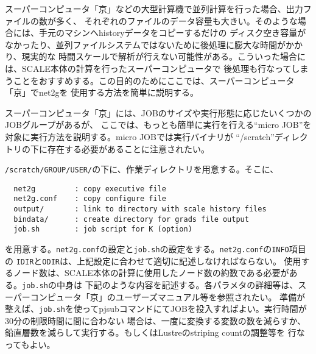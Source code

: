 スーパーコンピュータ「京」などの大型計算機で並列計算を行った場合、出力ファイルの数が多く、
それぞれのファイルのデータ容量も大きい。そのような場合には、手元のマシンへhistoryデータをコピーするだけの
ディスク空き容量がなかったり、並列ファイルシステムではないために後処理に膨大な時間がかかり、現実的な
時間スケールで解析が行えない可能性がある。こういった場合には、SCALE本体の計算を行ったスーパーコンピュータで
後処理も行なってしまうことをおすすめする。この目的のためにここでは、スーパーコンピュータ「京」でnet2gを
使用する方法を簡単に説明する。

スーパーコンピュータ「京」には、JOBのサイズや実行形態に応じたいくつかのJOBグループがあるが、
ここでは、もっとも簡単に実行を行える``micro JOB''を対象に実行方法を説明する。micro JOBでは実行バイナリが
``/scratch''ディレクトリの下に存在する必要があることに注意されたい。

\verb|/scratch/GROUP/USER/|の下に、作業ディレクトリを用意する。そこに、
\begin{verbatim}
  net2g         : copy executive file
  net2g.conf    : copy configure file
  output/       : link to directory with scale history files
  bindata/      : create directory for grads file output
  job.sh        : job script for K (option)
\end{verbatim}
を用意する。\verb|net2g.conf|の設定と\verb|job.sh|の設定をする。\verb|net2g.conf|の\verb|INFO|項目の
\verb|IDIR|と\verb|ODIR|は、上記設定に合わせて適切に記述しなければならない。
使用するノード数は、SCALE本体の計算に使用したノード数の約数である必要がある。\verb|job.sh|の中身は
下記のような内容を記述する。各パラメタの詳細等は、スーパーコンピュータ「京」のユーザーズマニュアル等を参照されたい。
準備が整えば、\verb|job.sh|を使ってpjsubコマンドにてJOBを投入すればよい。実行時間が30分の制限時間に間に合わない
場合は、一度に変換する変数の数を減らすか、鉛直層数を減らして実行する。もしくはLustreのstriping countの調整等を
行なってもよい。\\

 \\
\\


